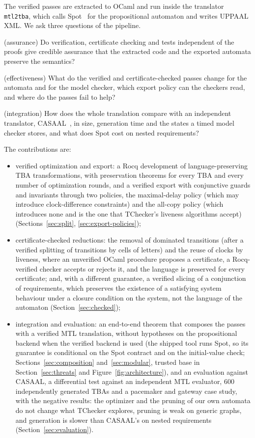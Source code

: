 \documentclass[preprint,12pt]{elsarticle}
\begin{document}
The verified passes are extracted to OCaml and run inside the translator \texttt{mtl2tba}, which calls Spot~\cite{spot} for the propositional automaton and writes UPPAAL XML. We ask three questions of the pipeline.
\begin{description}[leftmargin=0pt,labelindent=0pt]
  \item[RQ1] (assurance) Do verification, certificate checking and tests independent of the proofs give credible assurance that the extracted code and the exported automata preserve the semantics?
  \item[RQ2] (effectiveness) What do the verified and certificate-checked passes change for the automata and for the model checker, which export policy can the checkers read, and where do the passes fail to help?
  \item[RQ3] (integration) How does the whole translation compare with an independent translator, CASAAL~\cite{casaal_tool}, in size, generation time and the states a timed model checker stores, and what does Spot cost on nested requirements?
\end{description}
The contributions are:
\begin{itemize}[leftmargin=*]
  \item verified optimization and export: a Rocq development of language-preserving TBA transformations, with preservation theorems for every TBA and every number of optimization rounds, and a verified export with conjunctive guards and invariants through two policies, the maximal-delay policy (which may introduce clock-difference constraints) and the all-copy policy (which introduces none and is the one that TChecker's liveness algorithms accept) (Sections~\ref{sec:split}, \ref{sec:export-policies});
  \item certificate-checked reductions: the removal of dominated transitions (after a verified splitting of transitions by cells of letters) and the reuse of clocks by liveness, where an unverified OCaml procedure proposes a certificate, a Rocq-verified checker accepts or rejects it, and the language is preserved for every certificate; and, with a different guarantee, a verified slicing of a conjunction of requirements, which preserves the existence of a satisfying system behaviour under a closure condition on the system, not the language of the automaton (Section~\ref{sec:checked});
  \item integration and evaluation: an end-to-end theorem that composes the passes with a verified MTL translation, without hypotheses on the propositional backend when the verified backend is used (the shipped tool runs Spot, so its guarantee is conditional on the Spot contract and on the initial-value check; Sections~\ref{sec:composition} and~\ref{sec:modular}, trusted base in Section~\ref{sec:threats} and Figure~\ref{fig:architecture}), and an evaluation against CASAAL, a differential test against an independent MTL evaluator, 600 independently generated TBAs and a pacemaker and gateway case study, with the negative results: the optimizer and the pruning of our own automata do not change what TChecker explores, pruning is weak on generic graphs, and generation is slower than CASAAL's on nested requirements (Section~\ref{sec:evaluation}).
\end{itemize}
\end{document}
